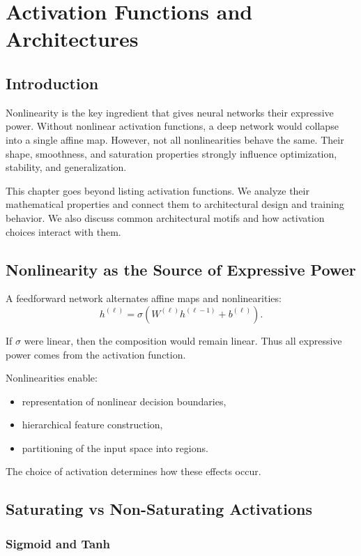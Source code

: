 \chapter{Activation Functions and Architectures}

\section{Introduction}

Nonlinearity is the key ingredient that gives neural networks their expressive power. Without nonlinear activation functions, a deep network would collapse into a single affine map. However, not all nonlinearities behave the same. Their shape, smoothness, and saturation properties strongly influence optimization, stability, and generalization.

This chapter goes beyond listing activation functions. We analyze their mathematical properties and connect them to architectural design and training behavior. We also discuss common architectural motifs and how activation choices interact with them.

\section{Nonlinearity as the Source of Expressive Power}

A feedforward network alternates affine maps and nonlinearities:
\[
h^{(\ell)} = \sigma(W^{(\ell)} h^{(\ell-1)} + b^{(\ell)}).
\]

If $\sigma$ were linear, then the composition would remain linear. Thus all expressive power comes from the activation function.

Nonlinearities enable:
\begin{itemize}
    \item representation of nonlinear decision boundaries,
    \item hierarchical feature construction,
    \item partitioning of the input space into regions.
\end{itemize}

The choice of activation determines how these effects occur.

\section{Saturating vs Non-Saturating Activations}

\subsection{Sigmoid and Tanh}

